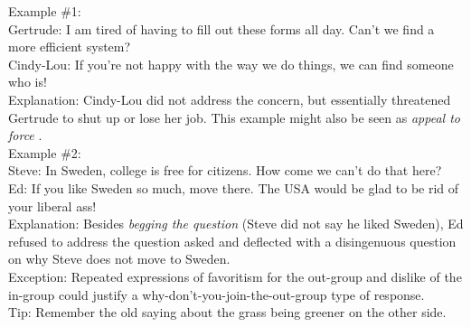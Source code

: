 \documentclass[a4paper,12pt,single,pdftex]{scrartcl}
\begin{document}
    
      Example \#1:
    \\

    
      Gertrude: I am tired of having to fill out these forms all day. Can't we find a more efficient system?
    \\

    
      Cindy-Lou: If you're not happy with the way we do things, we can find someone who is!
    \\

    
      Explanation: Cindy-Lou did not address the concern, but essentially threatened Gertrude to shut up or lose her job. This example might also be seen as {\it appeal to force} .
    \\

    
      Example \#2:
    \\

    
      Steve: In Sweden, college is free for citizens. How come we can't do that here?
    \\

    
      Ed: If you like Sweden so much, move there. The USA would be glad to be rid of your liberal ass!
    \\

    
      Explanation: Besides {\it begging the question} (Steve did not say he liked Sweden), Ed refused to address the question asked and deflected with a disingenuous question on why Steve does not move to Sweden.
    \\

    
      Exception: Repeated expressions of favoritism for the out-group and dislike of the in-group could justify a why-don't-you-join-the-out-group type of response.
    \\

    
      Tip: Remember the old saying about the grass being greener on the other side.
    \\
\end{document}
